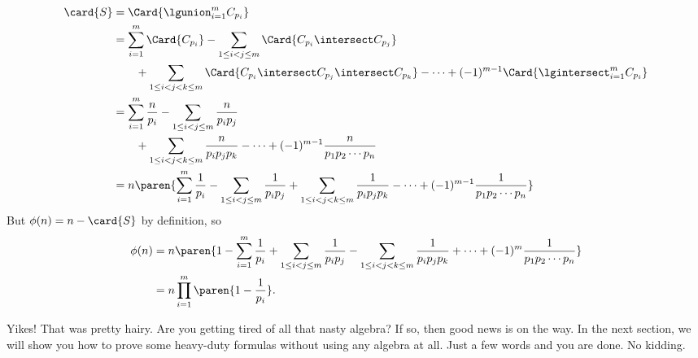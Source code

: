 \begin{align*}
\card{S}
  & = \Card{\lgunion_{i=1}^m C_{p_i}}\\
  & = \sum_{i=1}^m \Card{C_{p_i}} - \sum_{1\leq i < j \leq m} \Card{C_{p_i} \intersect C_{p_j}}\\
  &\qquad  + \sum_{1\leq i < j < k \leq m} \Card{C_{p_i} \intersect C_{p_j} \intersect C_{p_k}} -
       \cdots + (-1)^{m-1} \Card{\lgintersect_{i=1}^m C_{p_i}}\\
  & = \sum_{i=1}^m \frac{n}{p_i} -
      \sum_{1\leq i < j \leq m} \frac{n}{p_ip_j}\\
  &\qquad  + \sum_{1\leq i < j < k \leq m} \frac{n}{p_ip_jp_k} -
       \cdots + (-1)^{m-1} \frac{n}{p_1p_2\cdots p_n}\\
  & = n\paren{\sum_{i=1}^m \frac{1}{p_i} -
      \sum_{1\leq i < j \leq m} \frac{1}{p_ip_j}
       + \sum_{1\leq i < j < k \leq m} \frac{1}{p_ip_jp_k} - \cdots
        + (-1)^{m-1} \frac{1}{p_1p_2\cdots p_n}}
\end{align*}
But $\phi(n)=n-\card{S}$ by definition, so
\begin{align}
  \phi(n) & = n\paren{1 - \sum_{i=1}^m \frac{1}{p_i} +  \sum_{1\leq i < j \leq m} \frac{1}{p_ip_j}
    - \sum_{1\leq i < j < k \leq m} \frac{1}{p_ip_jp_k} + \cdots
    + (-1)^m\frac{1}{p_1p_2\cdots p_n}}\notag\\
          &  = n \prod_{i=1}^m \paren{1 - \frac{1}{p_i}}.\label{inex-phi}
\end{align}

Yikes!  That was pretty hairy.  Are you getting tired of all that
nasty algebra?  If so, then good news is on the way.  In the next
section, we will show you how to prove some heavy-duty formulas
without using any algebra at all.  Just a few words and you are done.
No kidding.

\begin{problems}
\practiceproblems
{}

\classproblems
{}

\homeworkproblems
{}

\examproblems
{}
\end{problems}

